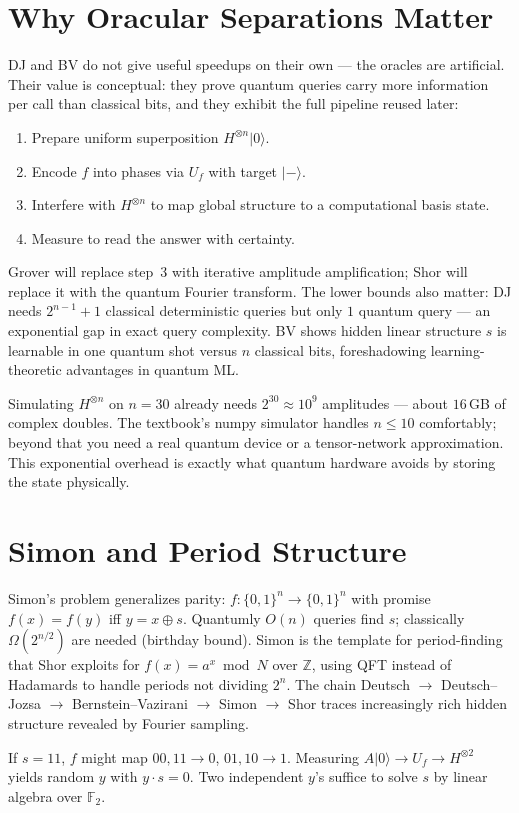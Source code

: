 \section{Why Oracular Separations Matter}
DJ and BV do not give useful speedups on their own --- the oracles are artificial. Their value is conceptual: they prove quantum queries carry more information per call than classical bits, and they exhibit the full pipeline reused later:
\begin{enumerate}[nosep,left=10pt]
\item Prepare uniform superposition $H^{\otimes n}\lvert0\rangle$.
\item Encode $f$ into phases via $U_f$ with target $\lvert-\rangle$.
\item Interfere with $H^{\otimes n}$ to map global structure to a computational basis state.
\item Measure to read the answer with certainty.
\end{enumerate}
Grover will replace step~3 with iterative amplitude amplification; Shor will replace it with the quantum Fourier transform. The lower bounds also matter: DJ needs $2^{n-1}+1$ classical deterministic queries but only $1$ quantum query --- an exponential gap in exact query complexity. BV shows hidden linear structure $s$ is learnable in one quantum shot versus $n$ classical bits, foreshadowing learning-theoretic advantages in quantum ML.

\begin{example}
Simulating $H^{\otimes n}$ on $n=30$ already needs $2^{30}\approx10^9$ amplitudes --- about $16$\,GB of complex doubles. The textbook's numpy simulator handles $n\le10$ comfortably; beyond that you need a real quantum device or a tensor-network approximation. This exponential overhead is exactly what quantum hardware avoids by storing the state physically.
\end{example}


\section{Simon and Period Structure}
Simon's problem generalizes parity: $f:\{0,1\}^n\to\{0,1\}^n$ with promise $f(x)=f(y)$ iff $y=x\oplus s$. Quantumly $O(n)$ queries find $s$; classically $\Omega(2^{n/2})$ are needed (birthday bound). Simon is the template for period-finding that Shor exploits for $f(x)=a^x\bmod N$ over $\mathbb Z$, using QFT instead of Hadamards to handle periods not dividing $2^n$. The chain Deutsch $\to$ Deutsch--Jozsa $\to$ Bernstein--Vazirani $\to$ Simon $\to$ Shor traces increasingly rich hidden structure revealed by Fourier sampling.
\begin{example}[Simon $n=2$]
If $s=11$, $f$ might map $00,11\to0$, $01,10\to1$. Measuring $A\lvert0\rangle\to U_f\to H^{\otimes2}$ yields random $y$ with $y\cdot s=0$. Two independent $y$'s suffice to solve $s$ by linear algebra over $\mathbb F_2$.
\end{example}


